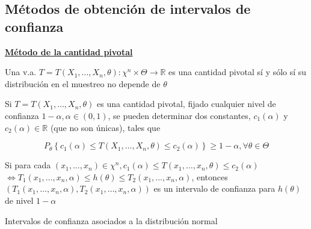\subsection{Métodos de obtención de intervalos de confianza}
\underline{\textbf{Método de la cantidad pivotal}}\\
\begin{definición}
    Una v.a. $T=T\left(X_{1}, \ldots, X_{n}, \theta\right): \chi^{n} \times \Theta
    \rightarrow \mathbb{R}$ es una cantidad pivotal sí y sólo sí su distribución en
    el muestreo no depende de $\theta$
\end{definición}


Si $T=T\left(X_{1}, \ldots, X_{n}, \theta\right)$ es una cantidad pivotal,
fijado cualquier nivel de confianza $1-\alpha, \alpha \in(0,1)$, se pueden
determinar dos constantes, $c_{1}(\alpha)$ y $c_{2}(\alpha) \in \mathbb{R}$
(que no son únicas), tales que

$$
    P_{\theta}\left\{c_{1}(\alpha) \leq T\left(X_{1}, \ldots, X_{n}, \theta\right) \leq c_{2}(\alpha)\right\} \geq 1-\alpha, \forall \theta \in \Theta
$$

Si para cada $\left(x_{1}, \ldots, x_{n}\right) \in \chi^{n}, c_{1}(\alpha)
    \leq T\left(x_{1}, \ldots, x_{n}, \theta\right) \leq c_{2}(\alpha)$
$\Leftrightarrow T_{1}\left(x_{1}, \ldots, x_{n}, \alpha\right) \leq h(\theta)
    \leq T_{2}\left(x_{1}, \ldots, x_{n}, \alpha\right)$, entonces
$\left(T_{1}\left(x_{1}, \ldots, x_{n}, \alpha\right), T_{2}\left(x_{1},
    \ldots, x_{n}, \alpha\right)\right)$ es un intervalo de confianza para
$h(\theta)$ de nivel $1-\alpha$

Intervalos de confianza asociados a la distribución normal\\


